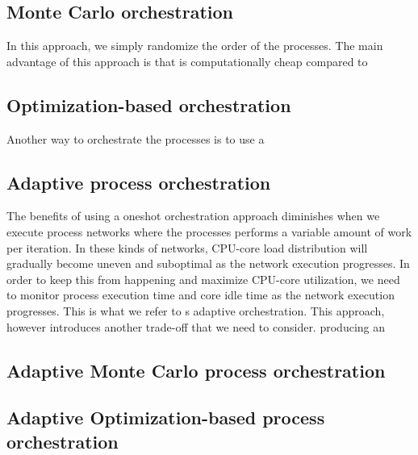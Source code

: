 \subsection{Monte Carlo orchestration}
In this approach, we simply randomize the order of the processes. The
main advantage of this approach is that is computationally cheap
compared to

\subsection{Optimization-based orchestration}
Another way to orchestrate the processes is to use a


\subsection{Adaptive process orchestration}
The benefits of using a oneshot orchestration approach diminishes when
we execute process networks where the processes performs a variable
amount of work per iteration. In these kinds of networks, CPU-core
load distribution will gradually become uneven and suboptimal as the
network execution progresses. In order to keep this from happening and
maximize CPU-core utilization, we need to monitor process execution
time and core idle time as the network execution progresses. This is
what we refer to s adaptive orchestration. This approach, however
introduces another trade-off that we need to consider. producing an

\subsection{Adaptive Monte Carlo process orchestration}

\subsection{Adaptive Optimization-based process orchestration}



